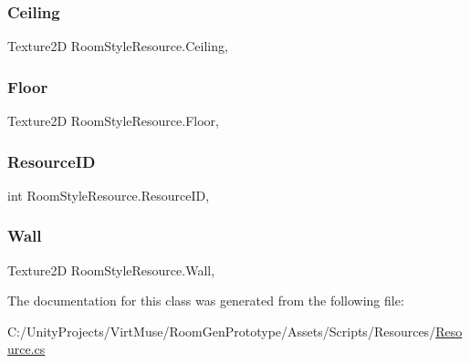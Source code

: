 \subsubsection{\texorpdfstring{Ceiling}{Ceiling}}
{\footnotesize\ttfamily Texture2D Room\+Style\+Resource.\+Ceiling\hspace{0.3cm}{\ttfamily [get]}, {\ttfamily [set]}}

\mbox{\label{class_room_style_resource_a9bb9edda92402b8e4889a168dfa13d6a}} 
\subsubsection{\texorpdfstring{Floor}{Floor}}
{\footnotesize\ttfamily Texture2D Room\+Style\+Resource.\+Floor\hspace{0.3cm}{\ttfamily [get]}, {\ttfamily [set]}}

\mbox{\label{class_room_style_resource_a113194d661027fdac0a956cdf19dc166}} 
\subsubsection{\texorpdfstring{Resource\+ID}{ResourceID}}
{\footnotesize\ttfamily int Room\+Style\+Resource.\+Resource\+ID\hspace{0.3cm}{\ttfamily [get]}, {\ttfamily [set]}}

\mbox{\label{class_room_style_resource_a7e7f15cc941b23c889b3ff8f1b05e732}} 
\subsubsection{\texorpdfstring{Wall}{Wall}}
{\footnotesize\ttfamily Texture2D Room\+Style\+Resource.\+Wall\hspace{0.3cm}{\ttfamily [get]}, {\ttfamily [set]}}



The documentation for this class was generated from the following file\+:\begin{DoxyCompactItemize}
\item 
C\+:/\+Unity\+Projects/\+Virt\+Muse/\+Room\+Gen\+Prototype/\+Assets/\+Scripts/\+Resources/\mbox{\hyperlink{_resource_8cs}{Resource.\+cs}}\end{DoxyCompactItemize}

